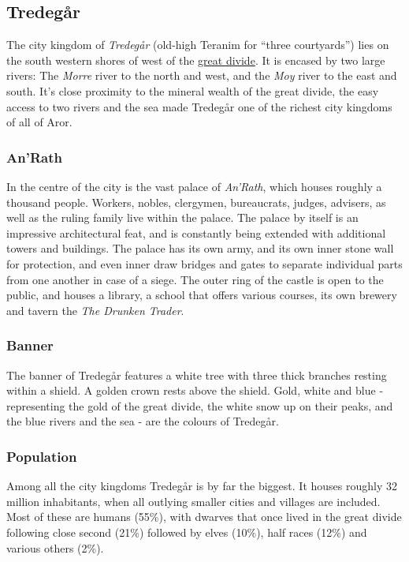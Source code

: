 \subsection{Tredegår}
\label{sec:Tredegar}

The city kingdom of \emph{Tredegår} (old-high Teranim for ``three courtyards'')
lies on the south western shores of  west of the
\hyperref[sec:Great Divide]{great divide}. It is encased by two large rivers:
The \emph{Morre} river to the north and west, and the \emph{Moy} river to the
east and south. It's close proximity to the mineral wealth of the great
divide, the easy access to two rivers and the sea made Tredegår one of the
richest city kingdoms of all of Aror.

\subsubsection{An'Rath}
\label{sec:AnRath}

In the centre of the city is the vast palace of \emph{An'Rath}, which houses
roughly a thousand people. Workers, nobles, clergymen, bureaucrats, judges,
advisers, as well as the ruling family live within the palace. The palace by
itself is an impressive architectural feat, and is constantly being extended
with additional towers and buildings. The palace has its own army, and its own
inner stone wall for protection, and even inner draw bridges and gates to
separate individual parts from one another in case of a siege. The outer ring
of the castle is open to the public, and houses a library, a school that
offers various courses, its own brewery and tavern the \emph{The Drunken
  Trader}.

\subsubsection{Banner}

The banner of Tredegår features a white tree with three thick branches resting
within a shield. A golden crown rests above the shield. Gold, white and blue -
representing the gold of the great divide, the white snow up on their peaks,
and the blue rivers and the sea - are the colours of Tredegår.

\subsubsection{Population}

Among all the city kingdoms Tredegår is by far the biggest. It houses roughly
32 million inhabitants, when all outlying smaller cities and villages are
included. Most of these are humans (55\%), with dwarves that once lived in the
great divide following close second (21\%) followed by elves (10\%), half
races (12\%) and various others (2\%).

